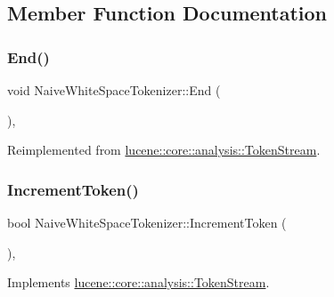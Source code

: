 \subsection{Member Function Documentation}
\mbox{\label{classNaiveWhiteSpaceTokenizer_a4c4f4debc08aa3e05b07b782144b5ae6}} 
\subsubsection{\texorpdfstring{End()}{End()}}
{\footnotesize\ttfamily void Naive\+White\+Space\+Tokenizer\+::\+End (\begin{DoxyParamCaption}{ }\end{DoxyParamCaption})\hspace{0.3cm}{\ttfamily [inline]}, {\ttfamily [virtual]}}



Reimplemented from \mbox{\hyperlink{classlucene_1_1core_1_1analysis_1_1TokenStream_a4693985ca7fb242412049a074027b8b5}{lucene\+::core\+::analysis\+::\+Token\+Stream}}.

\mbox{\label{classNaiveWhiteSpaceTokenizer_aa1dcc35eedacdb6107441cb9010d60b0}} 
\subsubsection{\texorpdfstring{Increment\+Token()}{IncrementToken()}}
{\footnotesize\ttfamily bool Naive\+White\+Space\+Tokenizer\+::\+Increment\+Token (\begin{DoxyParamCaption}{ }\end{DoxyParamCaption})\hspace{0.3cm}{\ttfamily [inline]}, {\ttfamily [virtual]}}



Implements \mbox{\hyperlink{classlucene_1_1core_1_1analysis_1_1TokenStream_a614d4ea24a354d6f4354b4941b5124e2}{lucene\+::core\+::analysis\+::\+Token\+Stream}}.

\mbox{\label{classNaiveWhiteSpaceTokenizer_aa532e6a3e2fa6a9ebb90a4324179a30f}} 
